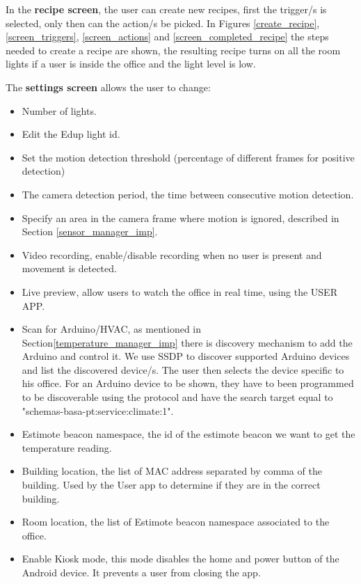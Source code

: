 In the \textbf{recipe screen}, the user can create new recipes, first the trigger/s is selected, only then can the action/s be picked. In Figures \ref{create_recipe}, \ref{screen_triggers}, \ref{screen_actions} and \ref{screen_completed_recipe} the steps needed to create a recipe are shown, the resulting recipe turns on all the room lights if a user is inside the office and the light level is low. 

The \textbf{settings screen} allows the user to change:
\begin{itemize}
  \item Number of lights.
  \item Edit the Edup light id.
  
  \item Set the motion detection threshold (percentage of different frames for positive detection)
  
  \item The camera detection period, the time between consecutive motion detection.
  
  \item Specify an area in the camera frame where motion is ignored, described in Section \ref{sensor_manager_imp}. 
  
  \item Video recording, enable/disable recording when no user is present and movement is detected.
  
  \item Live preview, allow users to watch the office in real time, using the USER APP.
  
  \item Scan for Arduino/HVAC, as mentioned in Section\ref{temperature_manager_imp} there is discovery mechanism to add the Arduino and control it. We use \ac{SSDP} to discover supported Arduino devices and list the discovered device/s. The user then selects the device specific to his office.
  For an Arduino device to be shown, they have to been programmed to be discoverable using the protocol and have the search target equal to "schemas-basa-pt:service:climate:1".
  
  \item Estimote beacon namespace, the id of the estimote beacon we want to get the temperature reading.
  
  \item Building location, the list of \ac{MAC address} separated by comma of the building. Used by the User app to determine if they are in the correct building.
  
  \item Room location, the list of Estimote beacon namespace associated to the office.
  
  
  \item Enable Kiosk mode, this mode disables the home and power button of the Android device. It prevents a user from closing the app. 
    
  
\end{itemize}

